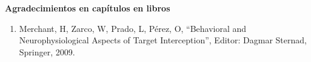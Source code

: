 {\large \textbf{Agradecimientos en capítulos en libros}}

\hrulefill

\begin{enumerate}

\item Merchant, H, Zarco, W, Prado, L, Pérez, O, “Behavioral and Neurophysiological Aspects of Target Interception”, Editor: Dagmar Sternad, 
Springer, 2009.

\end{enumerate}

